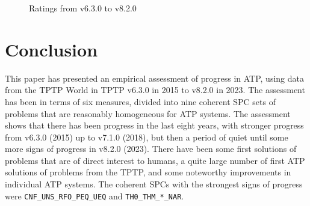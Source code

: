 \documentclass[runningheads]{llncs}
\begin{document}
\begin{figure}[t!]
\begin{minipage}[t]{.49\textwidth}
  \vspace*{-2em}
  \caption{Ratings from v6.3.0 to v8.2.0}
  \label{Ratings_v6.3.0_v8.2.0}
\end{minipage}
\end{figure}

\section{Conclusion}
\label{Conclusion}

This paper has presented an empirical assessment of progress in ATP, using data from the TPTP
World in TPTP v6.3.0 in 2015 to v8.2.0 in 2023.
The assessment has been in terms of six measures, divided into nine coherent SPC sets of problems
that are reasonably homogeneous for ATP systems.
The assessment shows that there has been progress in the last eight years, with stronger progress 
from v6.3.0 (2015) up to v7.1.0 (2018), but then a period of quiet until some more signs of 
progress in v8.2.0 (2023).
There have been some first solutions of problems that are of direct interest to humans,
a quite large number of first ATP solutions of problems from the TPTP, and
some noteworthy improvements in individual ATP systems.
The coherent SPCs with the strongest signs of progress were {\tt CNF\_UNS\_RFO\_PEQ\_UEQ} and
{\tt TH0\_THM\_*\_NAR}.
\end{document}
